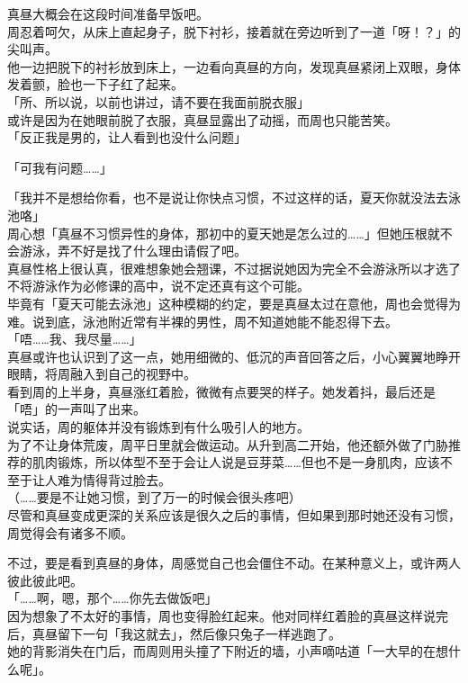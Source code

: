 真昼大概会在这段时间准备早饭吧。\\

周忍着呵欠，从床上直起身子，脱下衬衫，接着就在旁边听到了一道「呀！？」的尖叫声。\\

他一边把脱下的衬衫放到床上，一边看向真昼的方向，发现真昼紧闭上双眼，身体发着颤，脸也一下子红了起来。\\

「所、所以说，以前也讲过，请不要在我面前脱衣服」\\

或许是因为在她眼前脱了衣服，真昼显露出了动摇，而周也只能苦笑。\\

「反正我是男的，让人看到也没什么问题」

「可我有问题……」

「我并不是想给你看，也不是说让你快点习惯，不过这样的话，夏天你就没法去泳池咯」\\

周心想「真昼不习惯异性的身体，那初中的夏天她是怎么过的……」但她压根就不会游泳，弄不好是找了什么理由请假了吧。\\

真昼性格上很认真，很难想象她会翘课，不过据说她因为完全不会游泳所以才选了不将游泳作为必修课的高中，说不定还真有这个可能。\\

毕竟有「夏天可能去泳池」这种模糊的约定，要是真昼太过在意他，周也会觉得为难。说到底，泳池附近常有半裸的男性，周不知道她能不能忍得下去。\\

「唔……我、我尽量……」\\

真昼或许也认识到了这一点，她用细微的、低沉的声音回答之后，小心翼翼地睁开眼睛，将周融入到自己的视野中。\\

看到周的上半身，真昼涨红着脸，微微有点要哭的样子。她发着抖，最后还是「唔」的一声叫了出来。\\

说实话，周的躯体并没有锻炼到有什么吸引人的地方。\\

为了不让身体荒废，周平日里就会做运动。从升到高二开始，他还额外做了门胁推荐的肌肉锻炼，所以体型不至于会让人说是豆芽菜……但也不是一身肌肉，应该不至于让人难为情得背过脸去。\\

（……要是不让她习惯，到了万一的时候会很头疼吧）\\

尽管和真昼变成更深的关系应该是很久之后的事情，但如果到那时她还没有习惯，周觉得会有诸多不顺。

不过，要是看到真昼的身体，周感觉自己也会僵住不动。在某种意义上，或许两人彼此彼此吧。\\

「……啊，嗯，那个……你先去做饭吧」\\

因为想象了不太好的事情，周也变得脸红起来。他对同样红着脸的真昼这样说完后，真昼留下一句「我这就去」，然后像只兔子一样逃跑了。\\

她的背影消失在门后，而周则用头撞了下附近的墙，小声嘀咕道「一大早的在想什么呢」。
